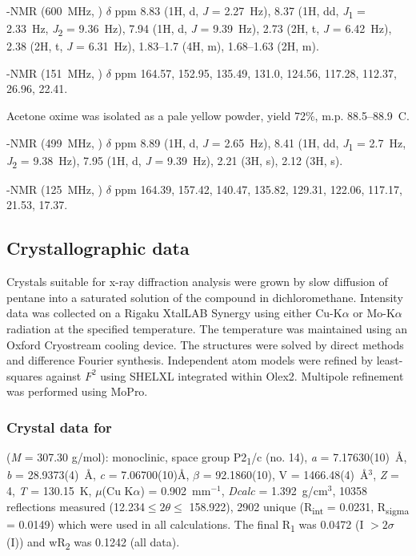 \begin{refsection}
-NMR (600~MHz, ) $\delta$ ppm 8.83 (1H, d, \textit{J} = 2.27~Hz), 8.37 (1H, dd, \textit{J}\textsubscript{1} = 2.33~Hz, \textit{J}\textsubscript{2} = 9.36~Hz), 7.94 (1H, d, \textit{J} = 9.39~Hz), 2.73 (2H, t, \textit{J} = 6.42~Hz), 2.38 (2H, t, \textit{J} = 6.31~Hz), 1.83--1.7 (4H, m), 1.68--1.63 (2H, m).

-NMR (151~MHz, ) $\delta$ ppm 164.57, 152.95, 135.49, 131.0, 124.56, 117.28, 112.37, 26.96, 22.41.

Acetone oxime  was isolated as a pale yellow powder, yield 72\%, m.p. 88.5--88.9\degree~C.

-NMR (499~MHz, ) $\delta$ ppm 8.89 (1H, d, \textit{J} = 2.65~Hz), 8.41 (1H, dd, \textit{J}\textsubscript{1} = 2.7~Hz, \textit{J}\textsubscript{2} = 9.38~Hz), 7.95 (1H, d, \textit{J} = 9.39~Hz), 2.21 (3H, s), 2.12 (3H, s).

-NMR (125~MHz, ) $\delta$ ppm 164.39, 157.42, 140.47, 135.82, 129.31, 122.06, 117.17, 21.53, 17.37.

\subsection{Crystallographic data}
Crystals suitable for x-ray diffraction analysis were grown by slow diffusion of pentane into a saturated solution of the compound in dichloromethane.
Intensity data was collected on a Rigaku XtalLAB Synergy using either Cu-K$\alpha$ or Mo-K$\alpha$ radiation at the specified temperature. 
The temperature was maintained using an Oxford Cryostream cooling device. 
The structures were solved by direct methods and difference Fourier synthesis.\autocite{Sheldrick2015}
Independent atom models were refined by least-squares against $F^{2}$ using SHELXL integrated within Olex2.\autocite{Sheldrick2008,Dolomanov2009}
Multipole refinement was performed using MoPro.\autocite{Jelsch2005}

\subsubsection{Crystal data for \texorpdfstring{}{C14H17N3O5}}
 (\emph{M} = 307.30 g/mol): monoclinic, space group P2\textsubscript{1}/c (no. 14), \emph{a} = 7.17630(10)~\AA{}, \emph{b} = 28.9373(4)~\AA{}, \emph{c} = 7.06700(10)\AA{}, $\beta$ = 92.1860(10)\degree{}, V = 1466.48(4)~\AA$^3$, \emph{Z} = 4, \emph{T} = 130.15~K, $\mu$(Cu K$\alpha$) = 0.902~mm$^{-1}$, \emph{Dcalc} = 1.392~g/cm$^3$, 10358 reflections measured (12.234\degree{}$\leq 2\theta \leq$ 158.922\degree{}), 2902 unique (R\textsubscript{int} = 0.0231, R\textsubscript{sigma} = 0.0149) which were used in all calculations. The final R\textsubscript{1} was 0.0472 (I $> 2\sigma$(I)) and wR\textsubscript{2} was 0.1242 (all data).


\end{refsection}
